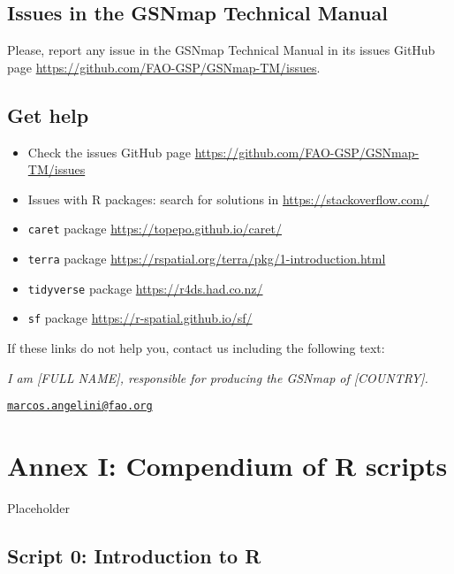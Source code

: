 \documentclass[
  10pt,
  b5paper,
  oneside]{book}
\providecommand{\tightlist}{%
  \setlength{\itemsep}{0pt}\setlength{\parskip}{0pt}}
\begin{document}
\hypertarget{issues-in-the-gsnmap-technical-manual}{%
\section{Issues in the GSNmap Technical Manual}\label{issues-in-the-gsnmap-technical-manual}}

Please, report any issue in the GSNmap Technical Manual in its issues GitHub page \url{https://github.com/FAO-GSP/GSNmap-TM/issues}.

\hypertarget{get-help}{%
\section{Get help}\label{get-help}}

\begin{itemize}
\tightlist
\item
  Check the issues GitHub page \url{https://github.com/FAO-GSP/GSNmap-TM/issues}
\item
  Issues with R packages: search for solutions in \url{https://stackoverflow.com/}
\item
  \texttt{caret} package \url{https://topepo.github.io/caret/}
\item
  \texttt{terra} package \url{https://rspatial.org/terra/pkg/1-introduction.html}
\item
  \texttt{tidyverse} package \url{https://r4ds.had.co.nz/}
\item
  \texttt{sf} package \url{https://r-spatial.github.io/sf/}
\end{itemize}

If these links do not help you, contact us including the following text:

\emph{I am {[}FULL NAME{]}, responsible for producing the GSNmap of {[}COUNTRY{]}.}

\href{mailto:marcos.angelini@fao.org}{\nolinkurl{marcos.angelini@fao.org}}

\hypertarget{annex-i-compendium-of-r-scripts}{%
\chapter*{Annex I: Compendium of R scripts}\label{annex-i-compendium-of-r-scripts}}

Placeholder

\hypertarget{script-0-introduction-to-r}{%
\section*{Script 0: Introduction to R}\label{script-0-introduction-to-r}}
\end{document}
